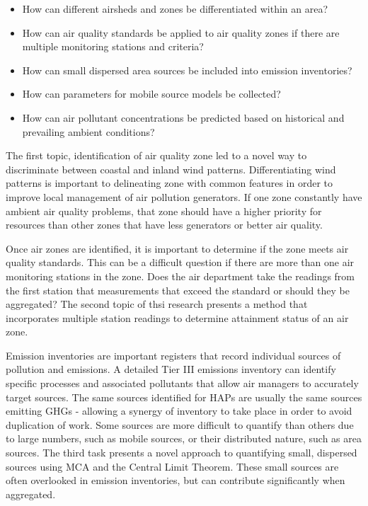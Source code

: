 \begin{itemize}
\item{How can different airsheds and zones be differentiated within an area?}
\item{How can air quality standards be applied to air quality zones if there are multiple monitoring stations and criteria?}
\item{How can small dispersed area sources be included into emission inventories?}
\item{How can parameters for mobile source models be collected?}
\item{How can air pollutant concentrations be predicted based on historical and prevailing ambient conditions?}
\end{itemize}

The first topic, identification of air quality zone led to a novel way to discriminate between coastal and inland wind patterns. Differentiating wind patterns is important to delineating zone with common features in order to improve local management of air pollution generators.  If one zone constantly have ambient air quality problems, that zone should have a higher priority for resources than other zones that have less generators or better air quality.

Once air zones are identified, it is important to determine if the zone meets air quality standards. This can be a difficult question if there are more than one air monitoring stations in the zone. Does the air department take the readings from the first station that measurements that exceed the standard or should they be aggregated? The second topic of thsi research presents a method that incorporates multiple station readings to determine attainment status of an air zone.  

Emission inventories are important registers that record individual sources of pollution and emissions. A detailed Tier III emissions inventory can identify specific processes and associated pollutants that allow air managers to accurately target sources. The same sources identified for HAPs are usually the same sources emitting GHGs - allowing a synergy of inventory to take place in order to avoid duplication of work. Some sources are more difficult to quantify than others due to large numbers, such as mobile sources, or their distributed nature, such as area sources. The third task presents a novel approach to quantifying small, dispersed sources using MCA and the Central Limit Theorem. These small sources are often overlooked in emission inventories, but can contribute significantly when aggregated.

